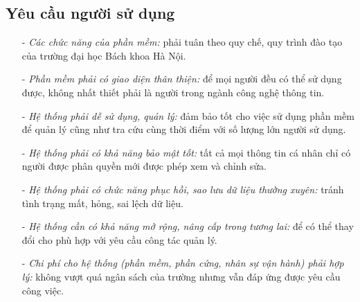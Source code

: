 \subsection{Yêu cầu người sử dụng}
\begin{itemize}
  \item[-] \textit{Các chức năng của phần mềm:} phải tuân theo quy chế, quy trình đào tạo của trường đại học Bách khoa Hà Nội.
  \item[-] \textit{Phần mềm phải có giao diện thân thiện:} để mọi người đều có thể sử dụng được, không nhất thiết phải là người trong ngành công nghệ thông tin.
  \item[-] \textit{Hệ thống phải dễ sử dụng, quản lý:} đảm bảo tốt cho việc sử dụng phần mềm để quản lý cũng như tra cứu cùng thời điểm với số lượng lớn người sử dụng.
  \item[-] \textit{Hệ thống phải có khả năng bảo mật tốt:} tất cả mọi thông tin cá nhân chỉ có người được phân quyền mới được phép xem và chỉnh sửa.
  \item[-] \textit{Hệ thống phải có chức năng phục hồi, sao lưu dữ liệu thường xuyên:} tránh tình trạng mất, hỏng, sai lệch dữ liệu.
  \item[-] \textit{Hệ thống cần có khả năng mở rộng, nâng cấp trong tương lai:} để có thể thay đổi cho phù hợp với yêu cầu công tác quản lý.
  \item[-] \textit{Chi phí cho hệ thống (phần mềm, phần cứng, nhân sự vận hành) phải hợp lý:} không vượt quá ngân sách của trường nhưng vẫn đáp ứng được yêu cầu công việc. 
\end{itemize}
